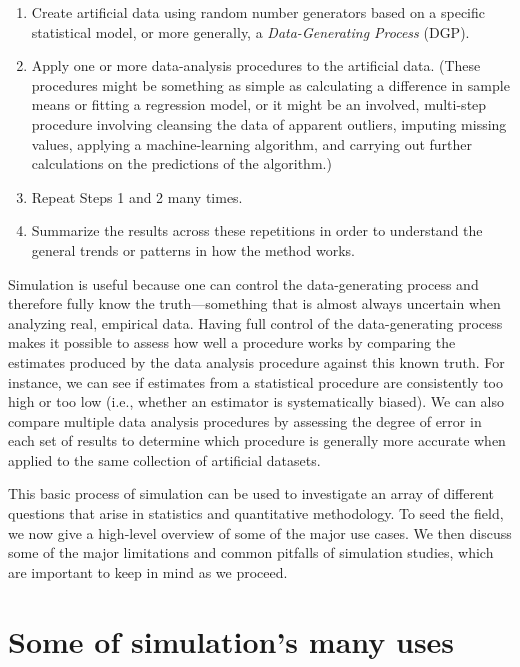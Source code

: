 \documentclass[
]{book}
\providecommand{\tightlist}{%
  \setlength{\itemsep}{0pt}\setlength{\parskip}{0pt}}
\begin{document}
\begin{enumerate}
\def\labelenumi{\arabic{enumi}.}
\tightlist
\item
  Create artificial data using random number generators based on a specific statistical model, or more generally, a \emph{Data-Generating Process} (DGP).
\item
  Apply one or more data-analysis procedures to the artificial data. (These procedures might be something as simple as calculating a difference in sample means or fitting a regression model, or it might be an involved, multi-step procedure involving cleansing the data of apparent outliers, imputing missing values, applying a machine-learning algorithm, and carrying out further calculations on the predictions of the algorithm.)
\item
  Repeat Steps 1 and 2 many times.
\item
  Summarize the results across these repetitions in order to understand the general trends or patterns in how the method works.
\end{enumerate}

Simulation is useful because one can control the data-generating process and therefore fully know the truth---something that is almost always uncertain when analyzing real, empirical data.
Having full control of the data-generating process makes it possible to assess how well a procedure works by comparing the estimates produced by the data analysis procedure against this known truth.
For instance, we can see if estimates from a statistical procedure are consistently too high or too low (i.e., whether an estimator is systematically biased).
We can also compare multiple data analysis procedures by assessing the degree of error in each set of results to determine which procedure is generally more accurate when applied to the same collection of artificial datasets.

This basic process of simulation can be used to investigate an array of different questions that arise in statistics and quantitative methodology.
To seed the field, we now give a high-level overview of some of the major use cases. We then discuss some of the major limitations and common pitfalls of simulation studies, which are important to keep in mind as we proceed.

\section{Some of simulation's many uses}\label{some-of-simulations-many-uses}
\end{document}
